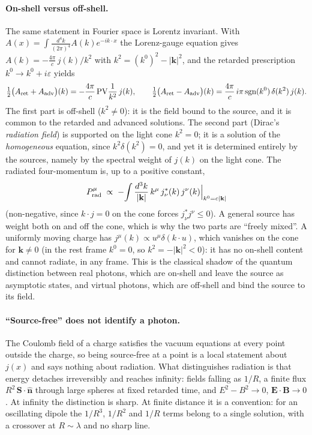 \documentclass[11pt,a4paper]{book}
\begin{document}
\paragraph{On-shell versus off-shell.} The same statement in Fourier space is Lorentz invariant. With
$A(x)=\int\!\frac{d^4k}{(2\pi)^4}A(k)e^{-ik\cdot x}$ the Lorenz-gauge equation gives
$A(k)=-\frac{4\pi}c\,j(k)/k^2$ with $k^2=(k^0)^2-|\mathbf k|^2$, and the retarded prescription
$k^0\to k^0+i\varepsilon$ yields
\begin{equation}
\tfrac12\bigl(A_{\rm ret}+A_{\rm adv}\bigr)(k)=-\frac{4\pi}{c}\,\mathrm{PV}\frac1{k^2}\,j(k),\qquad
\tfrac12\bigl(A_{\rm ret}-A_{\rm adv}\bigr)(k)=\frac{4\pi}{c}\,i\pi\,\mathrm{sgn}(k^0)\,\delta(k^2)\,j(k).
\end{equation}
The first part is off-shell ($k^2\ne0$): it is the field bound to the source, and it is common to the
retarded and advanced solutions. The second part (Dirac's \emph{radiation field}) is supported on the light cone
$k^2=0$; it is a solution of the \emph{homogeneous} equation, since $k^2\delta(k^2)=0$, and yet it is determined
entirely by the sources, namely by the spectral weight of $j(k)$ on the light cone. The radiated four-momentum is,
up to a positive constant,
\begin{equation}
P^\mu_{\rm rad}\;\propto\;-\!\int\frac{d^3k}{|\mathbf k|}\,k^\mu\,j^*_\nu(k)\,j^\nu(k)\Big|_{k^0=c|\mathbf k|}
\end{equation}
(non-negative, since $k\cdot j=0$ on the cone forces $j^*_\nu j^\nu\le0$). A general source has weight both on and off the cone,
which is why the two parts are ``freely mixed''. A uniformly moving charge has $j^\mu(k)\propto u^\mu\delta(k\cdot u)$,
which vanishes on the cone for $\mathbf k\ne0$ (in the rest frame $k^0=0$, so $k^2=-|\mathbf k|^2<0$):
it has no on-shell content and cannot radiate, in any frame. This is the classical shadow of the quantum
distinction between real photons, which are on-shell and leave the source as asymptotic states, and virtual photons,
which are off-shell and bind the source to its field.

\paragraph{``Source-free'' does not identify a photon.} The Coulomb field of a charge satisfies the vacuum
equations at every point outside the charge, so being source-free at a point is a local statement
about $j(x)$ and says nothing about radiation. What distinguishes radiation is that energy detaches irreversibly
and reaches infinity: fields falling as $1/R$, a finite flux $R^2\,\mathbf S\cdot\hat{\mathbf n}$ through large spheres at
fixed retarded time, and $E^2-B^2\to0$, $\mathbf E\cdot\mathbf B\to0$. At infinity the distinction is sharp. At finite
distance it is a convention: for an oscillating dipole the $1/R^3$, $1/R^2$ and $1/R$ terms belong to a single
solution, with a crossover at $R\sim\lambda$ and no sharp line.
\end{document}
